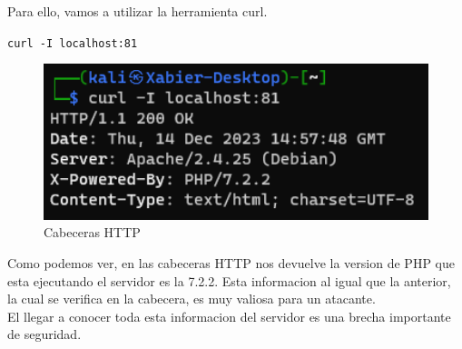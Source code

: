 \documentclass{report}
\begin{document}
                Para ello, vamos a utilizar la herramienta curl.
                \begin{center}
                    \texttt{curl -I localhost:81}
                \end{center}
                \begin{figure}[H]
                    \centering
                    \includegraphics[width=1\textwidth]{./img/vulnerabilidades/2.4/1.2.png}
                    \caption{Cabeceras HTTP}
                \end{figure}
                Como podemos ver, en las cabeceras HTTP nos devuelve la version de PHP que esta ejecutando el servidor es la 7.2.2.
                Esta informacion al igual que la anterior, la cual se verifica en la cabecera, es muy valiosa para un atacante.\\

                El llegar a conocer toda esta informacion del servidor es una brecha importante de seguridad.

            \clearpage
\end{document}
